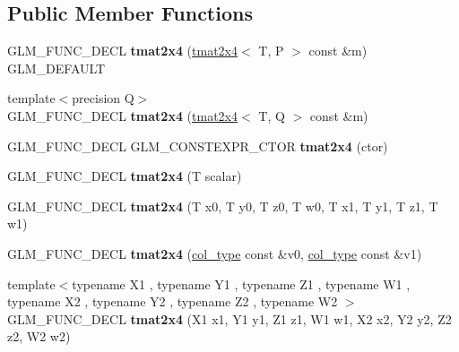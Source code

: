\subsection*{Public Member Functions}
\begin{DoxyCompactItemize}
\item 
\mbox{\label{structglm_1_1tmat2x4_a4f619511e1e69d88ca2bfb4e69702a91}} 
G\+L\+M\+\_\+\+F\+U\+N\+C\+\_\+\+D\+E\+CL {\bfseries tmat2x4} (\hyperlink{structglm_1_1tmat2x4}{tmat2x4}$<$ T, P $>$ const \&m) G\+L\+M\+\_\+\+D\+E\+F\+A\+U\+LT
\item 
\mbox{\label{structglm_1_1tmat2x4_acde6e5b863afd65e1608a8fe2a374d53}} 
{\footnotesize template$<$precision Q$>$ }\\G\+L\+M\+\_\+\+F\+U\+N\+C\+\_\+\+D\+E\+CL {\bfseries tmat2x4} (\hyperlink{structglm_1_1tmat2x4}{tmat2x4}$<$ T, Q $>$ const \&m)
\item 
\mbox{\label{structglm_1_1tmat2x4_a62cb4837f5a4f1ce13180b7244ae18f9}} 
G\+L\+M\+\_\+\+F\+U\+N\+C\+\_\+\+D\+E\+CL G\+L\+M\+\_\+\+C\+O\+N\+S\+T\+E\+X\+P\+R\+\_\+\+C\+T\+OR {\bfseries tmat2x4} (ctor)
\item 
\mbox{\label{structglm_1_1tmat2x4_a505b0400c0e78d9ff5af6b35e2896a6c}} 
G\+L\+M\+\_\+\+F\+U\+N\+C\+\_\+\+D\+E\+CL {\bfseries tmat2x4} (T scalar)
\item 
\mbox{\label{structglm_1_1tmat2x4_a91cbda002eac92848fa933cf76e5fb30}} 
G\+L\+M\+\_\+\+F\+U\+N\+C\+\_\+\+D\+E\+CL {\bfseries tmat2x4} (T x0, T y0, T z0, T w0, T x1, T y1, T z1, T w1)
\item 
\mbox{\label{structglm_1_1tmat2x4_ab80c8f32add0a9897a7d179597f07a25}} 
G\+L\+M\+\_\+\+F\+U\+N\+C\+\_\+\+D\+E\+CL {\bfseries tmat2x4} (\hyperlink{structglm_1_1tvec4}{col\+\_\+type} const \&v0, \hyperlink{structglm_1_1tvec4}{col\+\_\+type} const \&v1)
\item 
\mbox{\label{structglm_1_1tmat2x4_ad2e63f3024aafac70e1c7dc97fa50b37}} 
{\footnotesize template$<$typename X1 , typename Y1 , typename Z1 , typename W1 , typename X2 , typename Y2 , typename Z2 , typename W2 $>$ }\\G\+L\+M\+\_\+\+F\+U\+N\+C\+\_\+\+D\+E\+CL {\bfseries tmat2x4} (X1 x1, Y1 y1, Z1 z1, W1 w1, X2 x2, Y2 y2, Z2 z2, W2 w2)

\end{DoxyCompactItemize}
